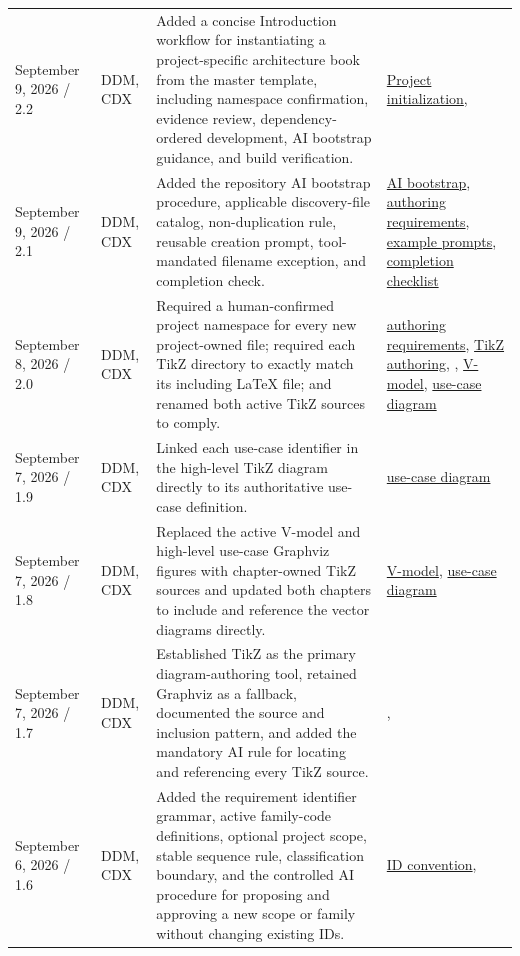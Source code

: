 \begin{tabularx}{\linewidth}{L{3.1cm}L{2.2cm}YL{2.0cm}}
September 9, 2026 / 2.2 & DDM, CDX & Added a concise Introduction workflow for instantiating a project-specific architecture book from the master template, including namespace confirmation, evidence review, dependency-ordered development, AI bootstrap guidance, and build verification. & \hyperref[Section:InitializeNewProject]{Project initialization}, \\
September 9, 2026 / 2.1 & DDM, CDX & Added the repository AI bootstrap procedure, applicable discovery-file catalog, non-duplication rule, reusable creation prompt, tool-mandated filename exception, and completion check. & \hyperref[Section:AIRepositoryBootstrap]{AI bootstrap}, \hyperref[Table:DocumentAuthoringRequirements]{authoring requirements}, \hyperref[Section:AIExamplePrompts]{example prompts}, \hyperref[Table:AICompletionChecklist]{completion checklist}\\
September 8, 2026 / 2.0 & DDM, CDX & Required a human-confirmed project namespace for every new project-owned file; required each TikZ directory to exactly match its including LaTeX file; and renamed both active TikZ sources to comply. & \hyperref[Table:DocumentAuthoringRequirements]{authoring requirements}, \hyperref[Section:TikZAuthoring]{TikZ authoring}, , \hyperref[Figure:VModel]{V-model}, \hyperref[Figure:UseCaseDiagram]{use-case diagram}\\
September 7, 2026 / 1.9 & DDM, CDX & Linked each use-case identifier in the high-level TikZ diagram directly to its authoritative use-case definition. & \hyperref[Figure:UseCaseDiagram]{use-case diagram}\\
September 7, 2026 / 1.8 & DDM, CDX & Replaced the active V-model and high-level use-case Graphviz figures with chapter-owned TikZ sources and updated both chapters to include and reference the vector diagrams directly. & \hyperref[Figure:VModel]{V-model}, \hyperref[Figure:UseCaseDiagram]{use-case diagram}\\
September 7, 2026 / 1.7 & DDM, CDX & Established TikZ as the primary diagram-authoring tool, retained Graphviz as a fallback, documented the source and inclusion pattern, and added the mandatory AI rule for locating and referencing every TikZ source. & , \\
September 6, 2026 / 1.6 & DDM, CDX & Added the requirement identifier grammar, active family-code definitions, optional project scope, stable sequence rule, classification boundary, and the controlled AI procedure for proposing and approving a new scope or family without changing existing IDs. & \hyperref[Table:RequirementIdentifierConvention]{ID convention}, \\

\end{tabularx}
